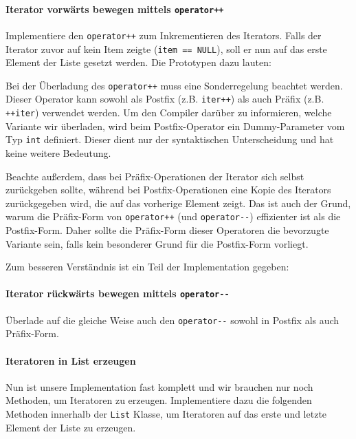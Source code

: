 
\paragraph{Iterator vorwärts bewegen mittels \lstinline{operator++}}

Implementiere den \lstinline{operator++} zum Inkrementieren des Iterators.
Falls der Iterator zuvor auf kein Item zeigte (\lstinline{item == NULL}), soll er nun auf das erste Element der Liste gesetzt werden.
Die Prototypen dazu lauten:


Bei der Überladung des \lstinline{operator++} muss eine Sonderregelung beachtet werden.
Dieser Operator kann sowohl als Postfix (z.B. \lstinline{iter++}) als auch Präfix (z.B. \lstinline{++iter}) verwendet werden.
Um den Compiler darüber zu informieren, welche Variante wir überladen, wird beim Postfix-Operator ein Dummy-Parameter vom Typ \lstinline{int} definiert.
Dieser dient nur der syntaktischen Unterscheidung und hat keine weitere Bedeutung.

Beachte außerdem, dass bei Präfix-Operationen der Iterator sich selbst zurückgeben sollte, während bei Postfix-Operationen eine Kopie des Iterators zurückgegeben wird, die auf das vorherige Element zeigt.
Das ist auch der Grund, warum die Präfix-Form von \lstinline{operator++} (und \lstinline{operator--}) effizienter ist als die Postfix-Form.
Daher sollte die Präfix-Form dieser Operatoren die bevorzugte Variante sein, falls kein besonderer Grund für die Postfix-Form vorliegt.

Zum besseren Verständnis ist ein Teil der Implementation gegeben:


\paragraph{Iterator rückwärts bewegen mittels \lstinline{operator--}}
Überlade auf die gleiche Weise auch den \lstinline{operator--} sowohl in Postfix als auch Präfix-Form.

\paragraph{Iteratoren in List erzeugen} 
Nun ist unsere Implementation fast komplett und wir brauchen nur noch Methoden, um Iteratoren zu erzeugen.
Implementiere dazu die folgenden Methoden innerhalb der \lstinline{List} Klasse, um Iteratoren auf das erste und letzte Element der Liste zu erzeugen.

